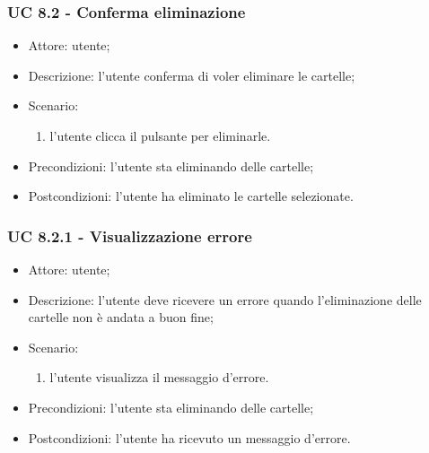     \subsubsection{UC 8.2 - Conferma eliminazione} \label{sec: UC 8.2}
    \begin{itemize}
        \item Attore: utente;
        \item Descrizione: l'utente conferma di voler eliminare le cartelle;
        \item Scenario:
        \begin{enumerate}
        \item l'utente clicca il pulsante per eliminarle.
        \end{enumerate}
        \item Precondizioni: l'utente sta eliminando delle cartelle;
        \item Postcondizioni: l'utente ha eliminato le cartelle selezionate.
    \end{itemize}

    \subsubsection{UC 8.2.1 - Visualizzazione errore } \label{sec: UC 8.2.1}
    \begin{itemize}
        \item Attore: utente;
        \item Descrizione: l'utente deve ricevere un errore quando l'eliminazione delle cartelle non è andata a buon fine;
        \item Scenario:
        \begin{enumerate}
        \item l'utente visualizza il messaggio d'errore.
        \end{enumerate}   
        \item Precondizioni: l'utente sta eliminando delle cartelle;
        \item Postcondizioni: l'utente ha ricevuto un messaggio d'errore.
    \end{itemize}

